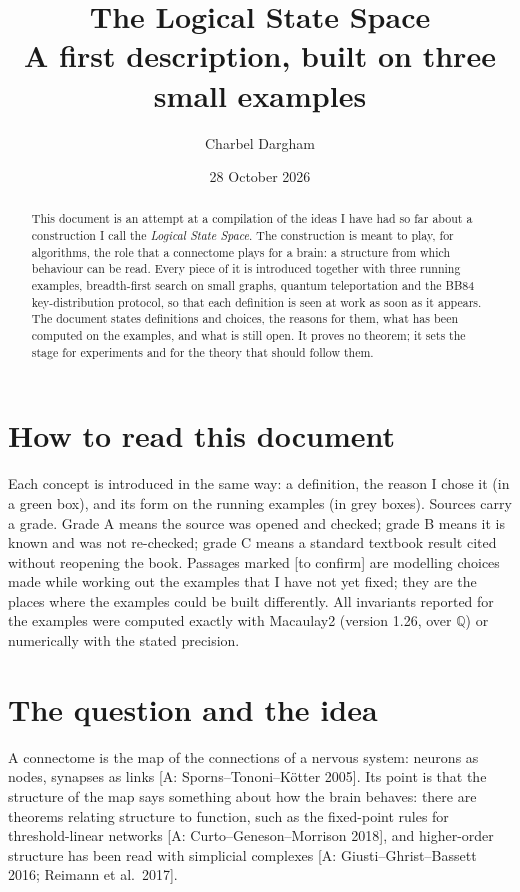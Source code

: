 \documentclass[11pt,a4paper]{article}
\title{The Logical State Space\\[0.3em]\large A first description, built on three small examples}
\author{Charbel Dargham}
\date{28 October 2026}
\newcommand{\Q}{\mathbb{Q}}
\newcommand{\gr}[1]{\textsf{[#1]}}
\newcommand{\tc}{\textsf{[to confirm]}}
\begin{document}
\maketitle

\begin{abstract}
This document is an attempt at a compilation of the ideas I have had so far about a construction I call the \emph{Logical State Space}. The construction is meant to play, for algorithms, the role that a connectome plays for a brain: a structure from which behaviour can be read. Every piece of it is introduced together with three running examples, breadth-first search on small graphs, quantum teleportation and the BB84 key-distribution protocol, so that each definition is seen at work as soon as it appears. The document states definitions and choices, the reasons for them, what has been computed on the examples, and what is still open. It proves no theorem; it sets the stage for experiments and for the theory that should follow them.
\end{abstract}

\section*{How to read this document}

Each concept is introduced in the same way: a definition, the reason I chose it (in a green box), and its form on the running examples (in grey boxes). Sources carry a grade. Grade A means the source was opened and checked; grade B means it is known and was not re-checked; grade C means a standard textbook result cited without reopening the book. Passages marked \tc{} are modelling choices made while working out the examples that I have not yet fixed; they are the places where the examples could be built differently. All invariants reported for the examples were computed exactly with Macaulay2 (version 1.26, over $\Q$) or numerically with the stated precision.

\tableofcontents

\section{The question and the idea}\label{sec:idea}

A connectome is the map of the connections of a nervous system: neurons as nodes, synapses as links \gr{A: Sporns--Tononi--Kötter 2005}. Its point is that the structure of the map says something about how the brain behaves: there are theorems relating structure to function, such as the fixed-point rules for threshold-linear networks \gr{A: Curto--Geneson--Morrison 2018}, and higher-order structure has been read with simplicial complexes \gr{A: Giusti--Ghrist--Bassett 2016; Reimann et al.\ 2017}.
\end{document}

